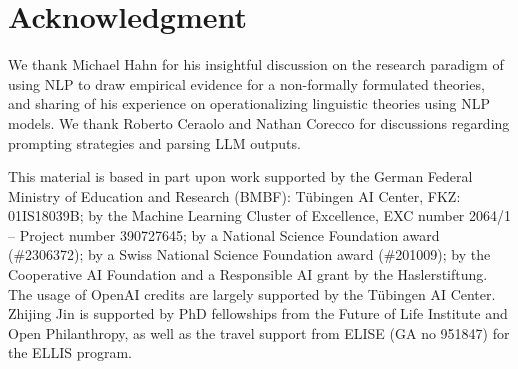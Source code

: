 \documentclass{article}
\newif\ifarxiv
\newcommand{\gio}[1]{ {\color{orange!70}\textit{#1}-$_\text{Gio}$}}
\begin{document}

\ifarxiv

\section*{Acknowledgment}
We thank Michael Hahn for his insightful discussion on the research paradigm of using NLP to draw empirical evidence for a non-formally formulated theories, and sharing of his experience on operationalizing linguistic theories using NLP models. We thank Roberto Ceraolo and Nathan Corecco for discussions regarding prompting strategies and parsing LLM outputs.

This material is based in part upon work supported by the German Federal Ministry of Education and Research (BMBF): Tübingen AI Center, FKZ: 01IS18039B; by the Machine Learning Cluster of Excellence, EXC number 2064/1 – Project number 390727645; by a National Science Foundation award (\#2306372); by a Swiss National Science Foundation award (\#201009); by the Cooperative AI Foundation and a Responsible AI grant by the Haslerstiftung.
The usage of OpenAI credits are largely supported by the Tübingen AI Center.
Zhijing Jin is supported by PhD fellowships from the Future of Life Institute and Open Philanthropy, as well as the travel support from ELISE (GA no 951847) for the ELLIS program. 
\end{document}
